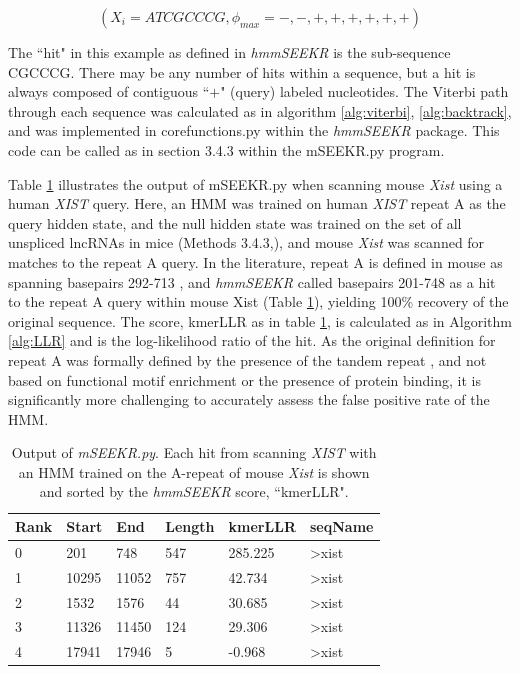 $$(X_i=ATCGCCCG,\phi_{max}=-,-,+,+,+,+,+,+)$$

The ``hit" in this example as defined in \emph{hmmSEEKR} is the sub-sequence CGCCCG. There may be any number of hits within a sequence, but a hit is always composed of contiguous ``$+$" (query) labeled nucleotides.  The Viterbi path through each sequence was calculated as in algorithm \ref{alg:viterbi}, \ref{alg:backtrack}, and was implemented in corefunctions.py within the \emph{hmmSEEKR} package. This code can be called as in section 3.4.3 within the mSEEKR.py program.

Table \ref{tbl:hmmresults} illustrates the output of mSEEKR.py when scanning mouse \emph{Xist} using a human \emph{XIST} query. Here, an HMM was trained on human \emph{XIST} repeat A as the query hidden state, and the null hidden state was trained on the set of all unspliced lncRNAs in  mice (Methods 3.4.3,\cite{Derrien2012TheExpression}), and mouse \emph{Xist} was scanned for matches to the repeat A query. In the literature, repeat A is defined in mouse as spanning basepairs 292-713 \cite{Brockdorff10TheNucleus.}, and \emph{hmmSEEKR} called basepairs 201-748 as a hit to the repeat A query within mouse Xist (Table \ref{tbl:hmmresults}), yielding 100\% recovery of the original sequence. The score, kmerLLR as in table \ref{tbl:hmmresults}, is calculated as in Algorithm \ref{alg:LLR} and is the log-likelihood ratio of the hit. As the original definition for repeat A was formally defined by the presence of the tandem repeat \cite{Brockdorff10TheNucleus.,Brown10TheNucleus.}, and not based on functional motif enrichment or the presence of protein binding, it is significantly more challenging to accurately assess the false positive rate of the HMM.


\begin{table}[h]
\centering
\begin{tabular}{|l|l|l|l|l|l|}
\hline 
Rank&Start & End   & Length & kmerLLR & seqName                               \\
\hline 
0     & 201   & 748    & 547     & 285.225  & \textgreater{}xist \\
1     & 10295 & 11052  & 757     & 42.734   & \textgreater{}xist \\
2     & 1532  & 1576   & 44      & 30.685  & \textgreater{}xist \\
3     & 11326 & 11450  & 124     & 29.306   & \textgreater{}xist \\
4     & 17941 & 17946  & 5       & -0.968 & \textgreater{}xist\\
\hline 
\end{tabular}
\caption[\emph{mSEEKR.py output file}]{Output of \emph{mSEEKR.py}. Each hit from scanning \emph{XIST} with an HMM trained on the A-repeat of mouse \emph{Xist} is shown and sorted by the \emph{hmmSEEKR} score, ``kmerLLR". }
\label{tbl:hmmresults}
\end{table}

